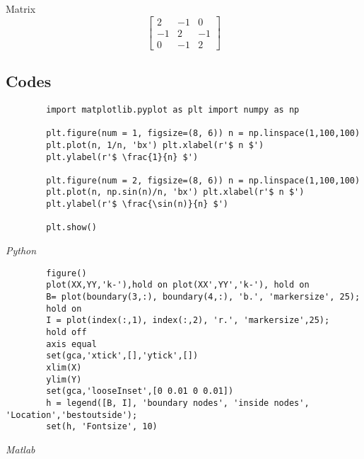 \documentclass[a4paper, 12pt]{article}
\begin{document}
Matrix
\[
    \begin{bmatrix}
        2 & -1 & 0\\
        -1& 2  &-1\\
        0 & -1 & 2
    \end{bmatrix}
\]

\clearpage
\begin{thebibliography}{99}
\end{thebibliography}

\clearpage

\begin{appendices}
    \section{Codes}
\begin{listing}[ht]
    \begin{verbatim}
        import matplotlib.pyplot as plt import numpy as np
        
        plt.figure(num = 1, figsize=(8, 6)) n = np.linspace(1,100,100)
        plt.plot(n, 1/n, 'bx') plt.xlabel(r'$ n $')
        plt.ylabel(r'$ \frac{1}{n} $')
        
        plt.figure(num = 2, figsize=(8, 6)) n = np.linspace(1,100,100)
        plt.plot(n, np.sin(n)/n, 'bx') plt.xlabel(r'$ n $')
        plt.ylabel(r'$ \frac{\sin(n)}{n} $')
        
        plt.show()
    \end{verbatim}
    \caption{\em Python}
\end{listing}

\begin{listing}[ht]
    \begin{verbatim}
        figure()
        plot(XX,YY,'k-'),hold on plot(XX',YY','k-'), hold on
        B= plot(boundary(3,:), boundary(4,:), 'b.', 'markersize', 25);
        hold on
        I = plot(index(:,1), index(:,2), 'r.', 'markersize',25);
        hold off
        axis equal
        set(gca,'xtick',[],'ytick',[])
        xlim(X)
        ylim(Y)
        set(gca,'looseInset',[0 0.01 0 0.01])
        h = legend([B, I], 'boundary nodes', 'inside nodes', 'Location','bestoutside');
        set(h, 'Fontsize', 10)
    \end{verbatim}
    \caption{\em Matlab}
\end{listing}
\end{appendices}
\end{document}
